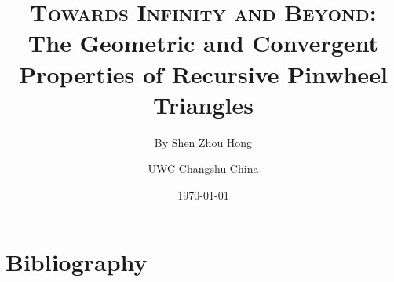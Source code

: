 \documentclass[12pt, a4paper, final, onecolumn, titlepage]{article}
\title{\textbf{\textsc{Towards Infinity and Beyond}: \\ The Geometric and Convergent Properties of Recursive Pinwheel Triangles}}
\author{By Shen Zhou Hong \and UWC Changshu China}
\date{\today}
\begin{document}
\maketitle
\tableofcontents
\clearpage



\clearpage
\nocite{*}
\section{Bibliography}
\printbibliography[heading=none]

\end{document}

